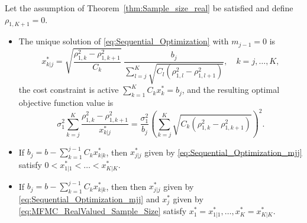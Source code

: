 \begin{theorem}  \label{thm:Sequential_Optimization_sample_size_real}
   Let the assumption of Theorem~\ref{thm:Sample_size_real} be satisfied and define $\rho_{1,K+1} = 0$.
   \begin{itemize}
   \item[i.] The unique solution of \eqref{eq:Sequential_Optimization} with $m_{j-1} = 0$ is
    \begin{equation}\label{eq:Sequential_Optimization_mjj}
             x_{k|j}^* = \sqrt{\frac{\rho_{1,k}^2 - \rho_{1,k+1}^2}{C_k}} \; 
                          \frac{b_j}{\sum_{l=j}^K \sqrt{C_l (\rho_{1,l}^2 - \rho_{1,l+1}^2)}},
             \quad k = j, \ldots, K,
     \end{equation}
    the cost constraint is active $\sum_{k=1}^K C_kx_k^* = b_j$, 
    and the resulting optimal objective function value is
     \begin{equation}\label{eq:MFMC_variance_optimal-j}
            \sigma_1^2  \sum_{k=j}^K \frac{ \rho_{1,k}^2 - \rho_{1,k+1}^2}{x_{k|j}^*}
           =  \frac{\sigma_1^2}{b_j}\!\left(\sum_{k=j}^K \sqrt{C_k (\rho_{1,k}^2 - \rho_{1,k+1}^2) }\right)^{\!2}.
       \end{equation}
    \item[ii.] If $b_j = b - \sum_{k=1}^{j-1} C_k x_{k|k}^*$, then $x_{j|j}^*$ given by
                  \eqref{eq:Sequential_Optimization_mjj} satisfy $0 < x_{1|1}^* < \ldots < x_{K|K}^*$.
    \item[iii.] If $b_j = b - \sum_{k=1}^{j-1} C_k x_{k|k}^*$, then 
                  then $x_{j|j}^*$ given by \eqref{eq:Sequential_Optimization_mjj} and
                 $x_j^*$ given by \eqref{eq:MFMC_RealValued_Sample_Size} satisfy
                  $x_1^* = x_{1|1}^*,  \ldots, x_K^* = x_{K|K}^*$.
    \end{itemize}
\end{theorem}
